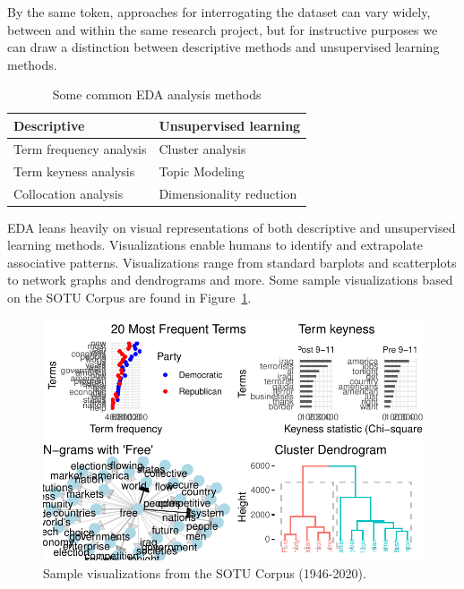 \documentclass[
  letterpaper,
]{scrbook}
\begin{document}
By the same token, approaches for interrogating the dataset can vary
widely, between and within the same research project, but for
instructive purposes we can draw a distinction between descriptive
methods and unsupervised learning methods.

\hypertarget{tbl-eda-approaches-table}{}
\begin{table}
\caption{\label{tbl-eda-approaches-table}Some common EDA analysis methods }\tabularnewline

\centering
\begin{tabular}{ll}
\toprule
Descriptive & Unsupervised learning\\
\midrule
Term frequency analysis & Cluster analysis\\
Term keyness analysis & Topic Modeling\\
Collocation analysis & Dimensionality reduction\\
\bottomrule
\end{tabular}
\end{table}

EDA leans heavily on visual representations of both descriptive and
unsupervised learning methods. Visualizations enable humans to identify
and extrapolate associative patterns. Visualizations range from standard
barplots and scatterplots to network graphs and dendrograms and more.
Some sample visualizations based on the SOTU Corpus are found in
Figure~\ref{fig-eda-visualizations-grid}.

\begin{figure}[h]

{\centering \includegraphics{./approaching-analysis_files/figure-pdf/fig-eda-visualizations-grid-1.pdf}

}

\caption{\label{fig-eda-visualizations-grid}Sample visualizations from
the SOTU Corpus (1946-2020).}

\end{figure}
\end{document}
